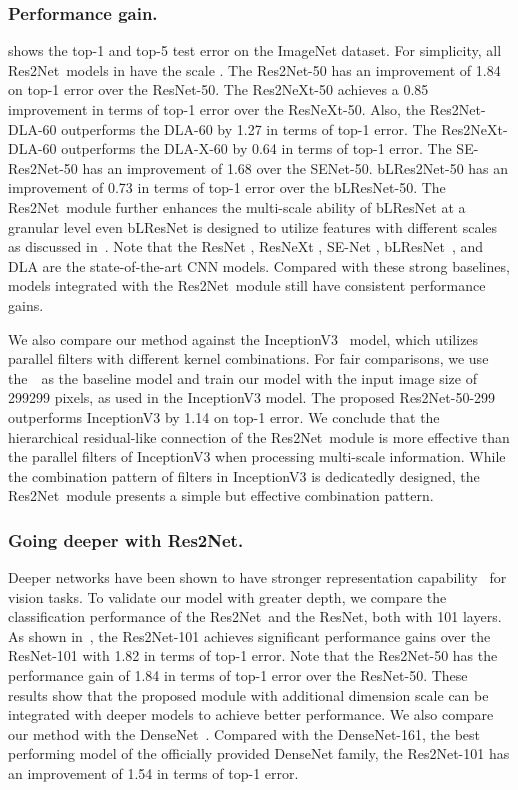 \documentclass[10pt,journal,cspaper,compsoc]{IEEEtran}
\newcommand{\myPara}[1]{\subsubsection{#1}}
\newcommand{\ourM}{{Res2Net}}
\begin{document}
\myPara{Performance gain.}
 shows the top-1 and top-5 test error 
on the ImageNet dataset.
For simplicity, all \ourM~models in  
have the scale .
The \ourM-50 has an improvement of 1.84 on top-1 error over the ResNet-50.
The Res2NeXt-50 achieves a 0.85 improvement in terms of top-1 error 
over the ResNeXt-50.
Also, the Res2Net-DLA-60 outperforms the DLA-60 by
1.27 in terms of top-1 error.
The Res2NeXt-DLA-60 outperforms the DLA-X-60 by
0.64 in terms of top-1 error.
The SE-Res2Net-50 has an improvement of 1.68 over the SENet-50.
bLRes2Net-50 has an improvement of 0.73 in terms of top-1 error 
over the bLResNet-50.
The \ourM~module further enhances the multi-scale ability of bLResNet 
at a granular level even bLResNet is designed to utilize features 
with different scales as discussed in~.
Note that the ResNet \cite{he2016deep}, ResNeXt \cite{xie2017aggregated},
SE-Net \cite{hu2018senet}, bLResNet~\cite{chen2018biglittle}, 
and DLA \cite{yu2018deep} are the state-of-the-art CNN models.
Compared with these strong baselines,
models integrated with the \ourM~module still have consistent performance gains.


We also compare our method against the 
InceptionV3~\cite{szegedy2016rethinking} model,
which  utilizes parallel filters with different kernel combinations.
For fair comparisons, we use the~\ResNet~as the baseline model and
train our model with the input image size of 299299 pixels,
as used in the InceptionV3 model.
The proposed \ourM-50-299 outperforms InceptionV3 by 1.14 on top-1 error.
We conclude that the hierarchical residual-like connection of the \ourM~module is more
effective than the parallel filters of InceptionV3 when processing multi-scale information.
While the combination pattern of filters in InceptionV3 is dedicatedly designed,
the \ourM~module presents a simple but effective combination pattern.










\myPara{Going deeper with \ourM.}

Deeper networks have been shown to have stronger representation
capability~\cite{he2016deep,xie2017aggregated} for vision tasks.
To validate our model with greater depth,
we compare the classification performance of the \ourM~and the ResNet,
both with 101 layers.
As shown in~,
the \ourM-101 achieves significant performance gains over
the ResNet-101 with 1.82 in terms of top-1 error.
Note that the \ourM-50 has the performance gain of 1.84 in terms
of top-1 error over the ResNet-50.
These results show that the proposed module with additional dimension scale
can be integrated with deeper models to achieve better performance.
We also compare our method with the DenseNet~\cite{huang2017densely}.
Compared with the DenseNet-161, the best performing model of the
officially provided DenseNet family,
the \ourM-101 has an improvement of 1.54 in terms of top-1 error.
\end{document}
